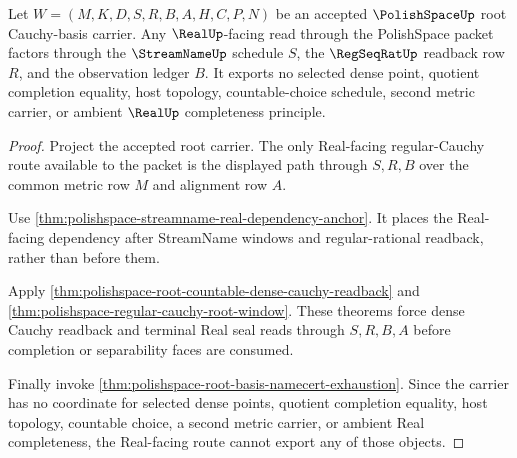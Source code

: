 \begin{theorem}
\label{thm:polishspace-real-regseqrat-nonescape}
Let $W=(M,K,D,S,R,B,A,H,C,P,N)$ be an accepted $\PolishSpaceUp$ root Cauchy-basis carrier. Any $\RealUp$-facing read through the PolishSpace packet factors through the $\StreamNameUp$ schedule $S$, the $\RegSeqRatUp$ readback row $R$, and the observation ledger $B$. It exports no selected dense point, quotient completion equality, host topology, countable-choice schedule, second metric carrier, or ambient $\RealUp$ completeness principle.
\end{theorem}
\begin{proof}
Project the accepted root carrier. The only Real-facing regular-Cauchy route available to the packet is the displayed path through $S,R,B$ over the common metric row $M$ and alignment row $A$.

Use \autoref{thm:polishspace-streamname-real-dependency-anchor}. It places the Real-facing dependency after StreamName windows and regular-rational readback, rather than before them.

Apply \autoref{thm:polishspace-root-countable-dense-cauchy-readback} and \autoref{thm:polishspace-regular-cauchy-root-window}. These theorems force dense Cauchy readback and terminal Real seal reads through $S,R,B,A$ before completion or separability faces are consumed.

Finally invoke \autoref{thm:polishspace-root-basis-namecert-exhaustion}. Since the carrier has no coordinate for selected dense points, quotient completion equality, host topology, countable choice, a second metric carrier, or ambient Real completeness, the Real-facing route cannot export any of those objects.
\end{proof}
